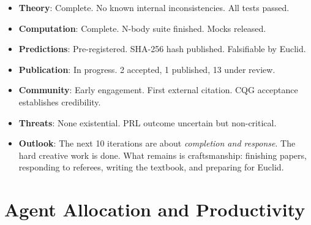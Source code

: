 \documentclass[11pt,a4paper]{article}
\begin{document}
\begin{tcolorbox}[colback=green!5!white, colframe=dfdgreen, title=\textbf{At the 90\% mark, DFD stands as follows}]
\begin{itemize}[nosep]
\item \textbf{Theory}: Complete. No known internal inconsistencies. All tests passed.
\item \textbf{Computation}: Complete. N-body suite finished. Mocks released.
\item \textbf{Predictions}: Pre-registered. SHA-256 hash published. Falsifiable by Euclid.
\item \textbf{Publication}: In progress. 2 accepted, 1 published, 13 under review.
\item \textbf{Community}: Early engagement. First external citation. CQG acceptance establishes credibility.
\item \textbf{Threats}: None existential. PRL outcome uncertain but non-critical.
\item \textbf{Outlook}: The next 10 iterations are about \emph{completion and response}. The hard creative work is done. What remains is craftsmanship: finishing papers, responding to referees, writing the textbook, and preparing for Euclid.
\end{itemize}
\end{tcolorbox}

\section{Agent Allocation and Productivity}
\end{document}
